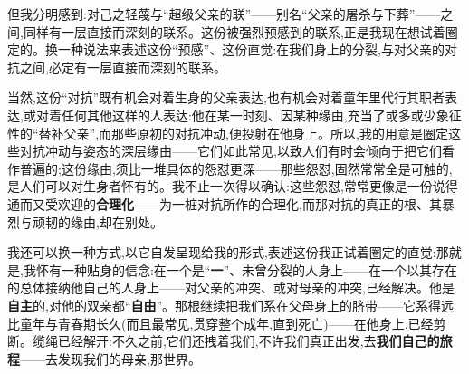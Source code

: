 但我分明感到:对己之轻蔑与“超级父亲的联”——别名“父亲的屠杀与下葬”——之间,同样有一层直接而深刻的联系。这份被强烈预感到的联系,正是我现在想试着圈定的。换一种说法来表述这份“预感”、这份直觉:在我们身上的分裂,与对父亲的对抗之间,必定有一层直接而深刻的联系。

当然,这份“对抗”既有机会对着生身的父亲表达,也有机会对着童年里代行其职者表达,或对着任何其他这样的人表达:他在某一时刻、因某种缘由,充当了或多或少象征性的“替补父亲”,而那些原初的对抗冲动,便投射在他身上。所以,我的用意是圈定这些对抗冲动与姿态的深层缘由——它们如此常见,以致人们有时会倾向于把它们看作普遍的;这份缘由,须比一堆具体的怨怼更深——那些怨怼,固然常常全是可触的,是人们可以对生身者怀有的。我不止一次得以确认:这些怨怼,常常更像是一份说得通而又受欢迎的\textbf{合理化}\dmark{}——为一桩对抗所作的合理化,而那对抗的真正的根、其暴烈与顽韧的缘由,却在别处。

我还可以换一种方式,以它自发呈现给我的形式,表述这份我正试着圈定的直觉:那就是,我怀有一种贴身的信念:在一个是“\textbf{一}”、未曾分裂的人身上——在一个以其存在的总体接纳他自己的人身上——对父亲的冲突、或对母亲的冲突,已经解决。他是\textbf{自主}的,对他的双亲都“\textbf{自由}”。那根继续把我们系在父母身上的脐带——它系得远比童年与青春期长久(而且最常见,贯穿整个成年,直到死亡)——在他身上,已经剪断。缆绳已经解开:不久之前,它们还拽着我们,不许我们真正出发,去\textbf{我们自己的旅程}——去发现我们的母亲,那世界。

